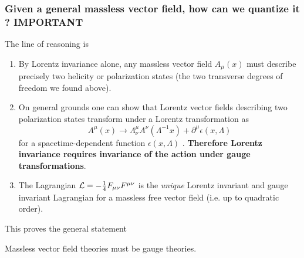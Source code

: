 \subsubsection{Given a general massless vector field, how can we quantize it ? IMPORTANT}
The line of reasoning is
\begin{enumerate}
	\item By Lorentz invariance alone, any massless vector field $A_\mu ( x )$ must describe precisely two helicity or polarization states (the two transverse degrees of freedom we found above).
	\item On general grounds one can show that Lorentz vector fields describing two polarization states
	transform under a Lorentz transformation as
	\begin{equation}
		A^\mu ( x ) \rightarrow \Lambda^\mu_\nu A^\nu(\Lambda^{-1} x) + \partial^\mu \epsilon(x,\Lambda)
	\end{equation}
	for a spacetime-dependent function $\epsilon(x,\Lambda)$ . \textbf{Therefore Lorentz invariance requires invariance
	of the action under gauge transformations}.
\item The Lagrangian $\mathcal{L} = -\frac{1}{4} F_{\mu \nu} F^{\mu \nu}$ is the \emph{unique} Lorentz invariant and gauge invariant Lagrangian
for a massless free vector field (i.e. up to quadratic order).
\end{enumerate}
This proves the general statement
\begin{statements}
	Massless vector field theories must be gauge theories.
\end{statements}
